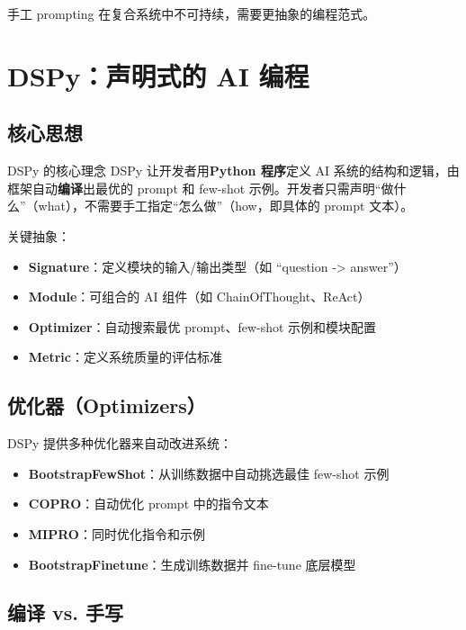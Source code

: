 \documentclass[a4paper]{article}
\begin{document}
手工 prompting 在复合系统中不可持续，需要更抽象的编程范式。

\section{DSPy：声明式的 AI 编程}

\subsection{核心思想}

\begin{importantbox}{DSPy 的核心理念}
DSPy 让开发者用\textbf{Python 程序}定义 AI 系统的结构和逻辑，由框架自动\textbf{编译}出最优的 prompt 和 few-shot 示例。开发者只需声明``做什么''（what），不需要手工指定``怎么做''（how，即具体的 prompt 文本）。
\end{importantbox}

关键抽象：
\begin{itemize}
    \item \textbf{Signature}：定义模块的输入/输出类型（如 ``question -> answer''）
    \item \textbf{Module}：可组合的 AI 组件（如 ChainOfThought、ReAct）
    \item \textbf{Optimizer}：自动搜索最优 prompt、few-shot 示例和模块配置
    \item \textbf{Metric}：定义系统质量的评估标准
\end{itemize}

\subsection{优化器（Optimizers）}

DSPy 提供多种优化器来自动改进系统：

\begin{itemize}
    \item \textbf{BootstrapFewShot}：从训练数据中自动挑选最佳 few-shot 示例
    \item \textbf{COPRO}：自动优化 prompt 中的指令文本
    \item \textbf{MIPRO}：同时优化指令和示例
    \item \textbf{BootstrapFinetune}：生成训练数据并 fine-tune 底层模型
\end{itemize}

\subsection{编译 vs. 手写}
\end{document}
